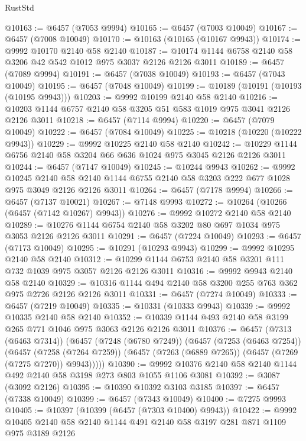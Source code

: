 \begin{lexlean}{RustStd}
\begin{coremodule}
@10163 := @6457 (@7053 @9994)
@10165 := @6457 (@7003 @10049)
@10167 := @6457 (@7008 @10049)
@10170 := @10163 (@10165 (@10167 @9943))
@10174 := @9992 @10170 @2140 @58 @2140
@10187 := @10174 @1144 @6758 @2140 @58 @3206 @42 @542 @1012 @975 @3037 @2126 @2126 @3011
@10189 := @6457 (@7089 @9994)
@10191 := @6457 (@7038 @10049)
@10193 := @6457 (@7043 @10049)
@10195 := @6457 (@7048 @10049)
@10199 := @10189 (@10191 (@10193 (@10195 @9943)))
@10203 := @9992 @10199 @2140 @58 @2140
@10216 := @10203 @1144 @6757 @2140 @58 @3205 @51 @583 @1019 @975 @3041 @2126 @2126 @3011
@10218 := @6457 (@7114 @9994)
@10220 := @6457 (@7079 @10049)
@10222 := @6457 (@7084 @10049)
@10225 := @10218 (@10220 (@10222 @9943))
@10229 := @9992 @10225 @2140 @58 @2140
@10242 := @10229 @1144 @6756 @2140 @58 @3204 @66 @636 @1024 @975 @3045 @2126 @2126 @3011
@10244 := @6457 (@7147 @10049)
@10245 := @10244 @9943
@10262 := @9992
    @10245
    @2140
    @58
    @2140
    @1144
    @6755
    @2140
    @58
    @3203
    @222
    @677
    @1028
    @975
    @3049
    @2126
    @2126
    @3011
@10264 := @6457 (@7178 @9994)
@10266 := @6457 (@7137 @10021)
@10267 := @7148 @9993
@10272 := @10264 (@10266 (@6457 (@7142 @10267) @9943))
@10276 := @9992 @10272 @2140 @58 @2140
@10289 := @10276 @1144 @6754 @2140 @58 @3202 @80 @697 @1034 @975 @3053 @2126 @2126 @3011
@10291 := @6457 (@7224 @10049)
@10293 := @6457 (@7173 @10049)
@10295 := @10291 (@10293 @9943)
@10299 := @9992 @10295 @2140 @58 @2140
@10312 := @10299 @1144 @6753 @2140 @58 @3201 @111 @732 @1039 @975 @3057 @2126 @2126 @3011
@10316 := @9992 @9943 @2140 @58 @2140
@10329 := @10316 @1144 @494 @2140 @58 @3200 @255 @763 @362 @975 @2726 @2126 @2126 @3011
@10331 := @6457 (@7274 @10049)
@10333 := @6457 (@7219 @10049)
@10335 := @10331 (@10333 @9943)
@10339 := @9992 @10335 @2140 @58 @2140
@10352 := @10339 @1144 @493 @2140 @58 @3199 @265 @771 @1046 @975 @3063 @2126 @2126 @3011
@10376 := @6457
    (@7313 (@6463 @7314))
    (@6457
      (@7248 (@6780 @7249))
      (@6457
        (@7253 (@6463 @7254))
        (@6457
          (@7258 (@7264 @7259))
          (@6457 (@7263 (@6889 @7265)) (@6457 (@7269 (@7275 @7270)) @9943)))))
@10390 := @9992 @10376 @2140 @58 @2140 @1144 @492 @2140 @58 @3198 @273 @803 @1055 @1106 @3081
@10392 := @3087 (@3092 @2126)
@10395 := @10390 @10392 @3103 @3185
@10397 := @6457 (@7338 @10049)
@10399 := @6457 (@7343 @10049)
@10400 := @7275 @9993
@10405 := @10397 (@10399 (@6457 (@7303 @10400) @9943))
@10422 := @9992
    @10405
    @2140
    @58
    @2140
    @1144
    @491
    @2140
    @58
    @3197
    @281
    @871
    @1109
    @975
    @3189
    @2126

\end{coremodule}
\end{lexlean}
